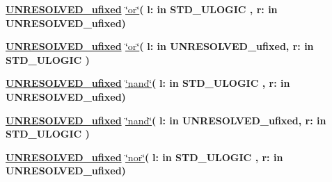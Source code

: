 \begin{DoxyCompactItemize}
\item 
{\bfseries {\bfseries {\bfseries \hyperlink{classfixed__pkg_ae78bc2b36d22f6abeac163955e8a587d}{U\+N\+R\+E\+S\+O\+L\+V\+E\+D\+\_\+ufixed}} \textcolor{vhdlchar}{ }}} \hyperlink{classfixed__pkg_a49b008e9f5d376048a0e7ea86c76857b}{\char`\"{}or\char`\"{}}{\bfseries  ( }{\bfseries \textcolor{vhdlchar}{l\+: }\textcolor{stringliteral}{in }{\bfseries \textcolor{comment}{S\+T\+D\+\_\+\+U\+L\+O\+G\+I\+C}\textcolor{vhdlchar}{ }}}{\bfseries  , \textcolor{vhdlchar}{r\+: }\textcolor{stringliteral}{in }\textcolor{vhdlchar}{U\+N\+R\+E\+S\+O\+L\+V\+E\+D\+\_\+ufixed}}{\bfseries  )} 
\item 
{\bfseries {\bfseries {\bfseries \hyperlink{classfixed__pkg_ae78bc2b36d22f6abeac163955e8a587d}{U\+N\+R\+E\+S\+O\+L\+V\+E\+D\+\_\+ufixed}} \textcolor{vhdlchar}{ }}} \hyperlink{classfixed__pkg_a49b008e9f5d376048a0e7ea86c76857b}{\char`\"{}or\char`\"{}}{\bfseries  ( }{\bfseries \textcolor{vhdlchar}{l\+: }\textcolor{stringliteral}{in }\textcolor{vhdlchar}{U\+N\+R\+E\+S\+O\+L\+V\+E\+D\+\_\+ufixed}}{\bfseries  , \textcolor{vhdlchar}{r\+: }\textcolor{stringliteral}{in }{\bfseries \textcolor{comment}{S\+T\+D\+\_\+\+U\+L\+O\+G\+I\+C}\textcolor{vhdlchar}{ }}}{\bfseries  )} 
\item 
{\bfseries {\bfseries {\bfseries \hyperlink{classfixed__pkg_ae78bc2b36d22f6abeac163955e8a587d}{U\+N\+R\+E\+S\+O\+L\+V\+E\+D\+\_\+ufixed}} \textcolor{vhdlchar}{ }}} \hyperlink{classfixed__pkg_a93bdc112624fd51322ef26af639a4218}{\char`\"{}nand\char`\"{}}{\bfseries  ( }{\bfseries \textcolor{vhdlchar}{l\+: }\textcolor{stringliteral}{in }{\bfseries \textcolor{comment}{S\+T\+D\+\_\+\+U\+L\+O\+G\+I\+C}\textcolor{vhdlchar}{ }}}{\bfseries  , \textcolor{vhdlchar}{r\+: }\textcolor{stringliteral}{in }\textcolor{vhdlchar}{U\+N\+R\+E\+S\+O\+L\+V\+E\+D\+\_\+ufixed}}{\bfseries  )} 
\item 
{\bfseries {\bfseries {\bfseries \hyperlink{classfixed__pkg_ae78bc2b36d22f6abeac163955e8a587d}{U\+N\+R\+E\+S\+O\+L\+V\+E\+D\+\_\+ufixed}} \textcolor{vhdlchar}{ }}} \hyperlink{classfixed__pkg_a93bdc112624fd51322ef26af639a4218}{\char`\"{}nand\char`\"{}}{\bfseries  ( }{\bfseries \textcolor{vhdlchar}{l\+: }\textcolor{stringliteral}{in }\textcolor{vhdlchar}{U\+N\+R\+E\+S\+O\+L\+V\+E\+D\+\_\+ufixed}}{\bfseries  , \textcolor{vhdlchar}{r\+: }\textcolor{stringliteral}{in }{\bfseries \textcolor{comment}{S\+T\+D\+\_\+\+U\+L\+O\+G\+I\+C}\textcolor{vhdlchar}{ }}}{\bfseries  )} 
\item 
{\bfseries {\bfseries {\bfseries \hyperlink{classfixed__pkg_ae78bc2b36d22f6abeac163955e8a587d}{U\+N\+R\+E\+S\+O\+L\+V\+E\+D\+\_\+ufixed}} \textcolor{vhdlchar}{ }}} \hyperlink{classfixed__pkg_abd2d2f63779c8a7703c306822b3c147b}{\char`\"{}nor\char`\"{}}{\bfseries  ( }{\bfseries \textcolor{vhdlchar}{l\+: }\textcolor{stringliteral}{in }{\bfseries \textcolor{comment}{S\+T\+D\+\_\+\+U\+L\+O\+G\+I\+C}\textcolor{vhdlchar}{ }}}{\bfseries  , \textcolor{vhdlchar}{r\+: }\textcolor{stringliteral}{in }\textcolor{vhdlchar}{U\+N\+R\+E\+S\+O\+L\+V\+E\+D\+\_\+ufixed}}{\bfseries  )} 

\end{DoxyCompactItemize}
